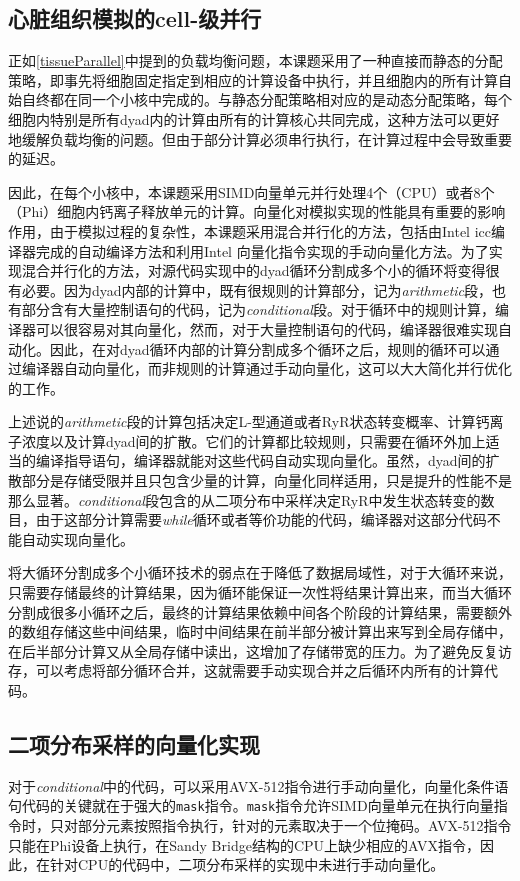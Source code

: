  
\subsection{心脏组织模拟的cell-级并行}
正如\ref{tissueParallel}中提到的负载均衡问题，本课题采用了一种直接而静态的分配策略，即事先将细胞固定指定到相应的计算设备中执行，并且细胞内的所有计算自始自终都在同一个小核中完成的。与静态分配策略相对应的是动态分配策略，每个细胞内特别是所有dyad内的计算由所有的计算核心共同完成，这种方法可以更好地缓解负载均衡的问题。但由于部分计算必须串行执行，在计算过程中会导致重要的延迟。

因此，在每个小核中，本课题采用SIMD向量单元并行处理4个（CPU）或者8个（Phi）细胞内钙离子释放单元的计算。向量化对模拟实现的性能具有重要的影响作用，由于模拟过程的复杂性，本课题采用混合并行化的方法，包括由Intel icc编译器完成的自动编译方法和利用Intel 向量化指令实现的手动向量化方法。为了实现混合并行化的方法，对源代码实现中的dyad循环分割成多个小的循环将变得很有必要。因为dyad内部的计算中，既有很规则的计算部分，记为\textit{arithmetic}段，也有部分含有大量控制语句的代码，记为\textit{conditional}段。对于循环中的规则计算，编译器可以很容易对其向量化，然而，对于大量控制语句的代码，编译器很难实现自动化。因此，在对dyad循环内部的计算分割成多个循环之后，规则的循环可以通过编译器自动向量化，而非规则的计算通过手动向量化，这可以大大简化并行优化的工作。

上述说的\textit{arithmetic}段的计算包括决定L-型通道或者RyR状态转变概率、计算钙离子浓度以及计算dyad间的扩散。它们的计算都比较规则，只需要在循环外加上适当的编译指导语句，编译器就能对这些代码自动实现向量化。虽然，dyad间的扩散部分是存储受限并且只包含少量的计算，向量化同样适用，只是提升的性能不是那么显著。\textit{conditional}段包含的从二项分布中采样决定RyR中发生状态转变的数目，由于这部分计算需要{\it while}循环或者等价功能的代码，编译器对这部分代码不能自动实现向量化。

将大循环分割成多个小循环技术的弱点在于降低了数据局域性，对于大循环来说，只需要存储最终的计算结果，因为循环能保证一次性将结果计算出来，而当大循环分割成很多小循环之后，最终的计算结果依赖中间各个阶段的计算结果，需要额外的数组存储这些中间结果，临时中间结果在前半部分被计算出来写到全局存储中，在后半部分计算又从全局存储中读出，这增加了存储带宽的压力。为了避免反复访存，可以考虑将部分循环合并，这就需要手动实现合并之后循环内所有的计算代码。

\subsection{二项分布采样的向量化实现}
对于\textit{conditional}中的代码，可以采用AVX-512指令进行手动向量化，向量化条件语句代码的关键就在于强大的\texttt{mask}指令。\texttt{mask}指令允许SIMD向量单元在执行向量指令时，只对部分元素按照指令执行，针对的元素取决于一个位掩码。AVX-512指令只能在Phi设备上执行，在Sandy Bridge结构的CPU上缺少相应的AVX指令，因此，在针对CPU的代码中，二项分布采样的实现中未进行手动向量化。

